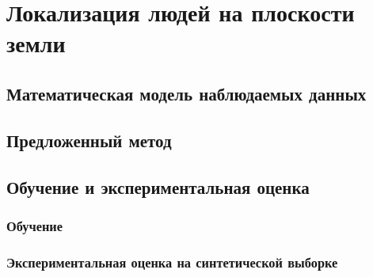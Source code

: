 \chapter{Локализация людей на плоскости земли} \label{chapt4}
\section{Математическая модель наблюдаемых данных}
\section{Предложенный метод}
\section{Обучение и экспериментальная оценка}
\subsection{Обучение}
\subsection{Экспериментальная оценка на синтетической выборке}
